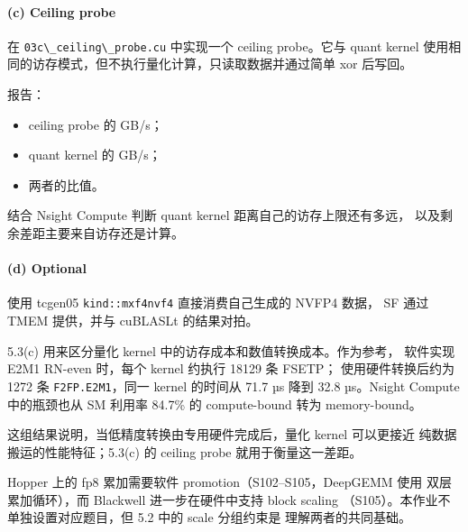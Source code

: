 \documentclass[11pt,a4paper,fontset=none]{ctexart}
\providecommand{\tightlist}{\setlength{\itemsep}{0pt}\setlength{\parskip}{0pt}}
\providecommand{\passthrough}[1]{#1}
\begin{document}
\paragraph{(c) Ceiling probe}\label{c-ceiling-probe}

在 \passthrough{\lstinline!03c\_ceiling\_probe.cu!} 中实现一个 ceiling
probe。它与 quant kernel
使用相同的访存模式，但不执行量化计算，只读取数据并通过简单 xor 后写回。

报告：

\begin{itemize}
\tightlist
\item
  ceiling probe 的 GB/s；
\item
  quant kernel 的 GB/s；
\item
  两者的比值。
\end{itemize}

结合 Nsight Compute 判断 quant kernel 距离自己的访存上限还有多远，
以及剩余差距主要来自访存还是计算。

\paragraph{(d) Optional}\label{d-optional}

使用 tcgen05 \passthrough{\lstinline!kind::mxf4nvf4!} 直接消费自己生成的
NVFP4 数据， SF 通过 TMEM 提供，并与 cuBLASLt 的结果对拍。

\begin{lookback}

5.3(c) 用来区分量化 kernel 中的访存成本和数值转换成本。作为参考，
软件实现 E2M1 RN-even 时，每个 kernel 约执行 18129 条 FSETP；
使用硬件转换后约为 1272 条 \passthrough{\lstinline!F2FP.E2M1!}，同一
kernel 的时间从 71.7 µs 降到 32.8 µs。Nsight Compute 中的瓶颈也从 SM
利用率 84.7\% 的 compute-bound 转为 memory-bound。

这组结果说明，当低精度转换由专用硬件完成后，量化 kernel 可以更接近
纯数据搬运的性能特征；5.3(c) 的 ceiling probe 就用于衡量这一差距。

Hopper 上的 fp8 累加需要软件 promotion（S102--S105，DeepGEMM 使用
双层累加循环），而 Blackwell 进一步在硬件中支持 block scaling
（S105）。本作业不单独设置对应题目，但 5.2 中的 scale 分组约束是
理解两者的共同基础。

\end{lookback}
\end{document}
